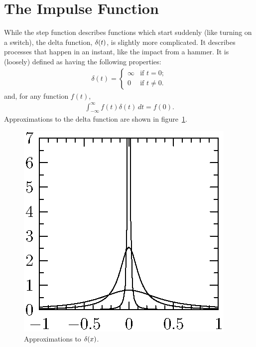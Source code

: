 \documentclass{book}
\begin{document}
\section{The Impulse Function}
While the step function describes functions which start suddenly (like turning
on a switch), the delta function, $\delta(t)$, is slightly more complicated. It
describes processes that happen in an instant, like the impact from a hammer.
It is (loosely) defined as having the following properties:
\begin{align}
\boxed{
\delta(t) = \left\{ \begin{array}{ll}
         \infty & \mbox{if $t = 0$};\\
        0 & \mbox{if $t \neq 0$}.\end{array} \right.
}
\end{align}
and, for any function $f(t)$,
\begin{align}\label{deltaprop}
\boxed{\int_{-\infty}^\infty f(t) \delta(t)\, dt = f(0)}.
\end{align}
Approximations to the delta function are shown in figure~\ref{deltafig}.
\begin{figure}[htbp]
  \begin{center}
    \includegraphics{201/delta}
    \caption{Approximations to $\delta(x)$.}
    \label{deltafig}
  \end{center}
\end{figure}
\end{document}
